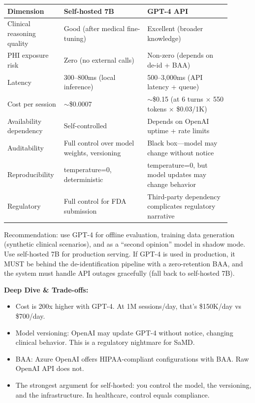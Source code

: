 \begin{tabular}{|p{0.2\linewidth}|p{0.35\linewidth}|p{0.35\linewidth}|}
\hline
\textbf{Dimension} & \textbf{Self-hosted 7B} & \textbf{GPT-4 API} \\
\hline
Clinical reasoning quality & Good (after medical fine-tuning) & Excellent (broader knowledge) \\
\hline
PHI exposure risk & Zero (no external calls) & Non-zero (depends on de-id + BAA) \\
\hline
Latency & 300--800ms (local inference) & 500--3,000ms (API latency + queue) \\
\hline
Cost per session & $\sim$\$0.0007 & $\sim$\$0.15 (at 6 turns $\times$ 550 tokens $\times$ \$0.03/1K) \\
\hline
Availability dependency & Self-controlled & Depends on OpenAI uptime + rate limits \\
\hline
Auditability & Full control over model weights, versioning & Black box---model may change without notice \\
\hline
Reproducibility & temperature=0, deterministic & temperature=0, but model updates may change behavior \\
\hline
Regulatory & Full control for FDA submission & Third-party dependency complicates regulatory narrative \\
\hline
\end{tabular}

\bigskip
Recommendation: use GPT-4 for offline evaluation, training data generation (synthetic clinical scenarios), and as a ``second opinion'' model in shadow mode. Use self-hosted 7B for production serving. If GPT-4 is used in production, it MUST be behind the de-identification pipeline with a zero-retention BAA, and the system must handle API outages gracefully (fall back to self-hosted 7B).

\textbf{Deep Dive \& Trade-offs:}
\begin{itemize}
  \item Cost is 200x higher with GPT-4. At 1M sessions/day, that's \$150K/day vs \$700/day.
  \item Model versioning: OpenAI may update GPT-4 without notice, changing clinical behavior. This is a regulatory nightmare for SaMD.
  \item BAA: Azure OpenAI offers HIPAA-compliant configurations with BAA. Raw OpenAI API does not.
  \item The strongest argument for self-hosted: you control the model, the versioning, and the infrastructure. In healthcare, control equals compliance.
\end{itemize}

